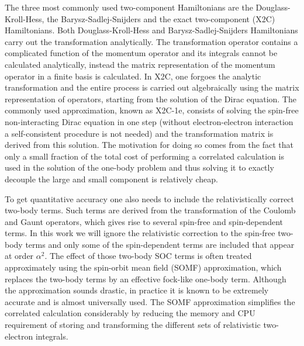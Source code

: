 \documentclass[10pt,aps,prb,twocolumn,amsmath,amssymb,superscriptaddress]{revtex4-1}
\begin{document}
The three most commonly used two-component Hamiltonians are the Douglass-Kroll-Hess\cite{Douglas1974,PhysRevA.33.3742,Nakajima2012,Reiher2006}, the Barysz-Sadlej-Snijders\cite{Barysz2002,Barysz2009,Ilias2005} and the exact two-component (X2C) Hamiltonians\cite{Dyall1997,Kutzelnigg2005,Liu2007,Ilias2007}. Both Douglass-Kroll-Hess and Barysz-Sadlej-Snijders Hamiltonians carry out the transformation analytically. The transformation operator contains a complicated function of the momentum operator and its integrals cannot be calculated analytically, instead the matrix representation of the momentum operator in a finite basis is calculated. In X2C, one forgoes the analytic transformation and the entire process is carried out algebraically using the matrix representation of operators, starting from the solution of the Dirac equation. The commonly used approximation, known as X2C-1e, consists of solving the spin-free non-interacting Dirac equation in one step (without electron-electron interaction a self-consistent procedure is not needed) and the transformation matrix is derived from this solution. The motivation for doing so comes from the fact that only a small fraction of the total cost of performing a correlated calculation is used in the solution of the one-body problem and thus solving it to exactly decouple the large and small component is relatively cheap.
	
To get quantitative accuracy one also needs to include the relativistically correct two-body terms. Such terms are derived from the transformation of the Coulomb and Gaunt operators, which gives rise to several spin-free and spin-dependent terms. In this work we will ignore the relativistic correction to the spin-free two-body terms and only some of the spin-dependent terms are included that appear at order $\alpha^{2}$. The effect of those two-body SOC terms is often treated approximately using the spin-orbit mean field
(SOMF) approximation\cite{Hessetal,Marian1996}, which replaces the two-body terms by an effective fock-like one-body term. Although the approximation sounds drastic, in practice it is known to be extremely accurate and is almost universally used. The SOMF approximation simplifies the correlated calculation considerably by reducing the memory and CPU requirement of storing and transforming the different sets of relativistic two-electron integrals.
\end{document}
